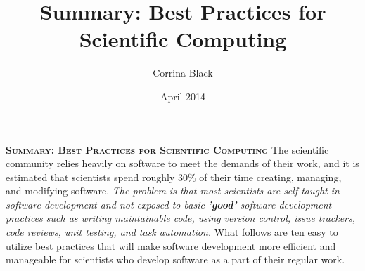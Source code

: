 \documentclass[12pt,a4paper,oneside,draft]{article}
\title{Summary: Best Practices for Scientific Computing}
\author{Corrina Black}
\date{April 2014}
\begin{document}
\noindent\textsc{\Large\textbf{Summary: Best Practices for Scientific Computing}}
\newline
\newline
\normalsize
The scientific community relies heavily on software to meet the demands of their work, and it is estimated that scientists spend roughly $30\%$ of their time creating, managing, and modifying software. \emph{The problem is that most scientists are self-taught in software development and not exposed to basic \textbf{'good'} software development practices such as writing maintainable
code, using version control, issue trackers, code reviews,
unit testing, and task automation.} What follows are ten easy to utilize best practices that will make software development more efficient and manageable for scientists who develop software as a part of their regular work.
\newline
\end{document}
